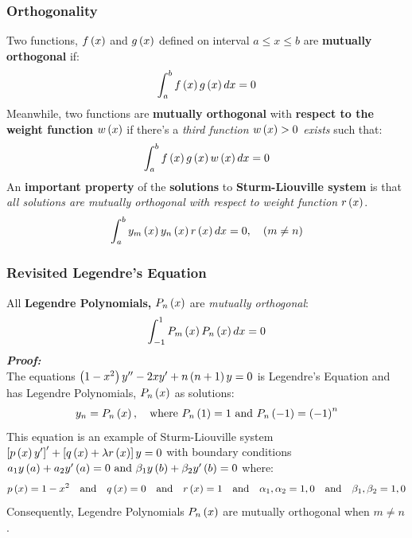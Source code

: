 \subsubsection{Orthogonality}
Two functions, $f\left(x\right)$ and $g\left(x\right)$ defined on interval $a\leq x\leq b$ are \textbf{mutually orthogonal} if:
\begin{equation}
    \int_{a}^{b}f\left(x\right)g\left(x\right)dx=0
\end{equation}
Meanwhile, two functions are \textbf{mutually orthogonal} with \textbf{respect to the weight function} $w\left(x\right)$ if there's a \textit{third function $w\left(x\right)>0$ exists} such that:
\begin{equation}
    \int_{a}^{b}f\left(x\right)g\left(x\right)w\left(x\right)dx=0
\end{equation}
An \textbf{important property} of the \textbf{solutions} to \textbf{Sturm-Liouville system} is that \textit{all solutions are mutually orthogonal with respect to weight function $r\left(x\right)$}.
\begin{equation}
    \int_{a}^{b}y_m\left(x\right)y_n\left(x\right)r\left(x\right)dx=0,\quad (m\neq n)
\end{equation}
\subsubsection{Revisited Legendre's Equation}
All \textbf{Legendre Polynomials,} $P_n\left(x\right)$ are \textit{mutually orthogonal}:
\begin{equation}
    \int_{-1}^{1}P_m\left(x\right)P_n\left(x\right)dx=0
\end{equation}
\textbf{\textit{Proof:}}\\
The equations $\left(1-x^2\right)y''-2xy'+n\left(n+1\right)y=0$ is Legendre's Equation and has Legendre Polynomials, $P_n\left(x\right)$ as solutions:
\begin{equation*}
    y_n=P_n\left(x\right),\quad\text{where }P_n\left(1\right)=1\text{ and }P_n\left(-1\right)=\left(-1\right)^n
\end{equation*}
This equation is an example of Sturm-Liouville system $\left[p\left(x\right)y'\right]'+\left[q\left(x\right)+\lambda r\left(x\right)\right]y=0$ with boundary conditions $a_1y\left(a\right)+a_2y'\left(a\right)=0\text{ and }\beta_1y\left(b\right)+\beta_2y'\left(b\right)=0$ where:
\begin{equation*}
    p\left(x\right)=1-x^2\quad\text{and}\quad q\left(x\right)=0\quad\text{and}\quad r\left(x\right)=1\quad\text{and}\quad \alpha_1,\alpha_2=1,0\quad\text{and}\quad\beta_1,\beta_2=1,0
\end{equation*}
Consequently, Legendre Polynomials $P_n\left(x\right)$ are mutually orthogonal when $m\neq n$.
